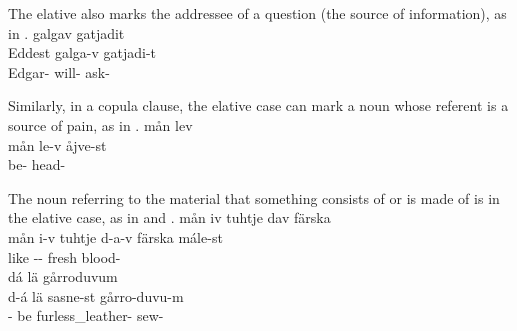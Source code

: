 The elative also marks the addressee of a question (the source of information), as in .
\ea\label{elat5}
\glll	{} galgav gatjadit\\
	Eddest galga-v gatjadi-t\\
	Edgar- will- ask-\\\nopagebreak
{} 
\z

Similarly, in a copula clause, the elative case can mark a noun whose referent is a source of pain, as in .
\ea\label{elat6}
\glll	mån lev \\
	mån le-v åjve-st\\
	 be- head-\\\nopagebreak
{} 
\z

The noun referring to the material that something consists of or is made of is in the elative case, as in  and . %
\ea\label{elat3}
\glll	mån iv tuhtje dav färska \\ %
	mån i-v tuhtje d-a-v färska mále-st\\ 
	  like\BS{} -- fresh blood-\\\nopagebreak
{} %
\z
\ea\label{elat4}
\glll	dá lä  gårroduvum\\
	d-á lä sasne-st gårro-duvu-m\\
	-\BS{} be\BS{} furless\_leather- sew-\\\nopagebreak
{} 
\z

